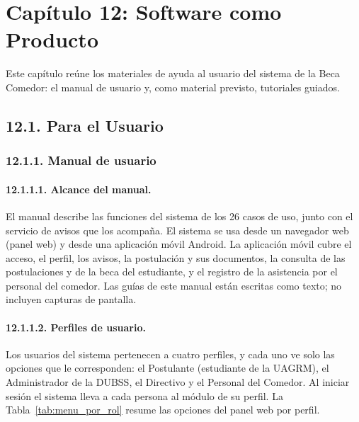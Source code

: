 
\newpage
\section{Capítulo 12: Software como Producto}\label{cap:producto}

Este capítulo reúne los materiales de ayuda al usuario del sistema de la Beca Comedor: el manual de usuario y, como material previsto, tutoriales guiados.

\subsection{12.1. Para el Usuario}

\subsubsection{12.1.1. Manual de usuario}

\paragraph{12.1.1.1. Alcance del manual.}

El manual describe las funciones del sistema de los 26 casos de uso, junto con el servicio de avisos que los acompaña. El sistema se usa desde un navegador web (panel web) y desde una aplicación móvil Android. La aplicación móvil cubre el acceso, el perfil, los avisos, la postulación y sus documentos, la consulta de las postulaciones y de la beca del estudiante, y el registro de la asistencia por el personal del comedor. Las guías de este manual están escritas como texto; no incluyen capturas de pantalla.

\paragraph{12.1.1.2. Perfiles de usuario.}

Los usuarios del sistema pertenecen a cuatro perfiles, y cada uno ve solo las opciones que le corresponden: el Postulante (estudiante de la UAGRM), el Administrador de la DUBSS, el Directivo y el Personal del Comedor. Al iniciar sesión el sistema lleva a cada persona al módulo de su perfil. La Tabla~\ref{tab:menu_por_rol} resume las opciones del panel web por perfil.

